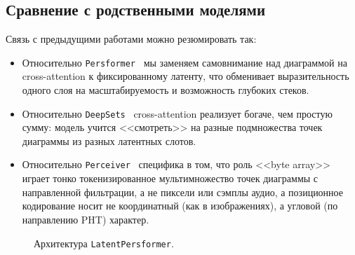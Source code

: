 \subsection{Сравнение с родственными моделями}

Связь с предыдущими работами можно резюмировать так:
\begin{itemize}
\item Относительно \texttt{Persformer}~\cite{reinauerPersformerTransformerArchitecture2021} мы заменяем самовнимание над диаграммой на cross-attention к фиксированному латенту, что обменивает выразительность одного слоя на масштабируемость и возможность глубоких стеков.
\item Относительно \texttt{DeepSets}~\cite{zaheerDeepSets2017} cross-attention реализует богаче, чем простую сумму: модель учится <<смотреть>> на разные подмножества точек диаграммы из разных латентных слотов.
\item Относительно \texttt{Perceiver}~\cite{jaeglePerceiverGeneralPerception2021} специфика в том, что роль <<byte array>> играет тонко токенизированное мультимножество точек диаграммы с направленной фильтрации, а не пиксели или сэмплы аудио, а позиционное кодирование носит не координатный (как в изображениях), а угловой (по направлению PHT) характер.
\end{itemize}

\begin{figure}[ht]
\centering
{}
\caption{Архитектура \texttt{LatentPersformer}.}
\label{fig:latent-persformer}
\end{figure}
